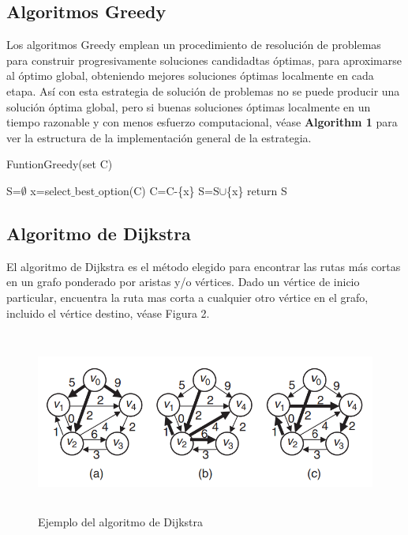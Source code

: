 \documentclass[12pt,twoside]{article}
\begin{document}
    \subsection{Algoritmos Greedy}
        Los algoritmos Greedy emplean un procedimiento de resoluci\'on de problemas para construir progresivamente soluciones candidadtas \'optimas, para aproximarse al \'optimo global, obteniendo mejores soluciones \'optimas localmente en cada etapa. As\'i con esta estrategia de soluci\'on de problemas no se puede producir una solución óptima global, pero si buenas soluciones \'optimas localmente en un tiempo razonable y con menos esfuerzo computacional, v\'ease {\bf Algorithm 1} para ver la estructura de la implementaci\'on general de la estrategia.
        \begin{algorithm}[H]
        \caption{FuntionGreedy(set C) }
            \begin{algorithmic}[1]
                \State S=$\emptyset$
                    \State x=select$\_$best$\_$option(C)
                    \State C=C-\{x\}
                        \State S=S$\cup$\{x\}
                    \EndIf
                \EndWhile
                    \State return S
                \EndIf
            \end{algorithmic}
        \end{algorithm}
    \subsection{Algoritmo de Dijkstra}
        El algoritmo de Dijkstra es el m\'etodo elegido para encontrar las rutas más cortas en un grafo ponderado por aristas y/o vértices. Dado un v\'ertice de inicio particular, encuentra la ruta mas corta a cualquier otro v\'ertice en el grafo, incluido el v\'ertice destino, v\'ease Figura 2.
        \begin{figure}[H]
            \centering
            \includegraphics[height=6cm]{imagenes/c2.png}
            \caption{Ejemplo del algoritmo de Dijkstra}
        \end{figure}
\end{document}
